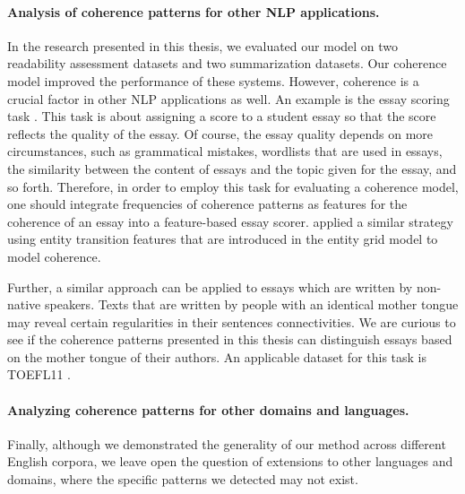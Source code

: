 \paragraph{Analysis of coherence patterns for other NLP applications.}
In the research presented in this thesis, we evaluated our model on two readability assessment datasets and two summarization datasets. 
Our coherence model improved the performance of these systems. 
However, coherence is a crucial factor in other NLP applications as well. 
An example is the essay scoring task \cite{dikli06,higgins04,miltsakaki04a}.  
This task is about assigning a score to a student essay so that the score reflects the quality of the essay. 
Of course, the essay quality depends on more circumstances, such as grammatical mistakes, wordlists that are used in essays, the similarity between the content of essays and the topic given for the essay, and so forth. 
Therefore, in order to employ this task for evaluating a coherence model,  one should integrate frequencies of coherence patterns as features for the coherence of an essay into a feature-based essay scorer. 
 applied a similar strategy using entity transition features that are introduced in the entity grid model \cite{barzilay05a} to model coherence.  

Further, a similar approach can be applied to essays which are written by non-native speakers. 
Texts that are written by people with an identical mother tongue may reveal certain regularities in their sentences connectivities.  
We are curious to see if the coherence patterns presented in this thesis can distinguish essays based on the mother tongue of their authors. 
An applicable dataset for this task is TOEFL11 \cite{blanchard11}. 

\paragraph{Analyzing coherence patterns for other domains and languages.}
Finally, although we demonstrated the generality of our method across different English corpora, we leave open the question of extensions to other languages and domains, where the specific patterns we detected may not exist. 



